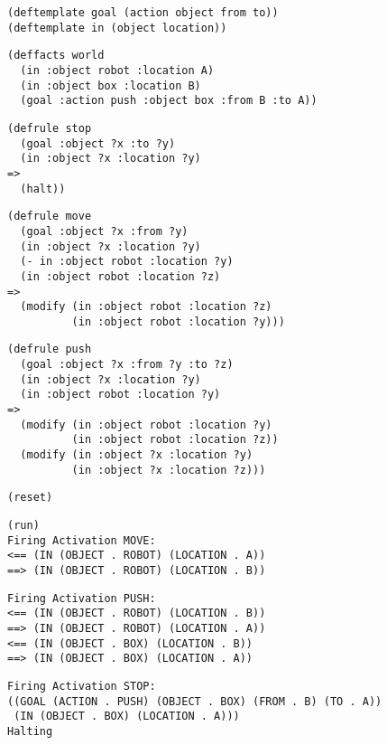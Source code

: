 \documentclass{article}
\begin{document}
\begin{verbatim}
(deftemplate goal (action object from to))
(deftemplate in (object location))
\end{verbatim}
\begin{verbatim}
(deffacts world
  (in :object robot :location A)
  (in :object box :location B)
  (goal :action push :object box :from B :to A))
\end{verbatim}
\begin{verbatim}
(defrule stop
  (goal :object ?x :to ?y)
  (in :object ?x :location ?y)
=>
  (halt))
\end{verbatim}
\begin{verbatim}
(defrule move
  (goal :object ?x :from ?y)
  (in :object ?x :location ?y)
  (- in :object robot :location ?y)
  (in :object robot :location ?z)
=>
  (modify (in :object robot :location ?z)
          (in :object robot :location ?y)))
\end{verbatim}
\begin{verbatim}
(defrule push
  (goal :object ?x :from ?y :to ?z)
  (in :object ?x :location ?y)
  (in :object robot :location ?y)
=>
  (modify (in :object robot :location ?y)
          (in :object robot :location ?z))
  (modify (in :object ?x :location ?y)
          (in :object ?x :location ?z)))
\end{verbatim}
\begin{verbatim}
(reset)
\end{verbatim}
\begin{verbatim}
(run)
Firing Activation MOVE:
<== (IN (OBJECT . ROBOT) (LOCATION . A))
==> (IN (OBJECT . ROBOT) (LOCATION . B))
\end{verbatim}
\begin{verbatim}
Firing Activation PUSH:
<== (IN (OBJECT . ROBOT) (LOCATION . B))
==> (IN (OBJECT . ROBOT) (LOCATION . A))
<== (IN (OBJECT . BOX) (LOCATION . B))
==> (IN (OBJECT . BOX) (LOCATION . A))
\end{verbatim}
\begin{verbatim}
Firing Activation STOP:
((GOAL (ACTION . PUSH) (OBJECT . BOX) (FROM . B) (TO . A))
 (IN (OBJECT . BOX) (LOCATION . A)))
Halting
\end{verbatim}
\end{document}
